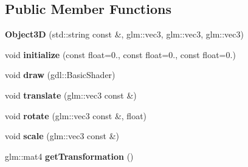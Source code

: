 \subsection*{Public Member Functions}
\begin{DoxyCompactItemize}
\item 
\hypertarget{class_object3_d_adae3ac8c78eeead08974001d61446d37}{}{\bfseries Object3\+D} (std\+::string const \&, glm\+::vec3, glm\+::vec3, glm\+::vec3)\label{class_object3_d_adae3ac8c78eeead08974001d61446d37}

\item 
\hypertarget{class_object3_d_a6c73462894a6de24d9a6281ce897d883}{}void {\bfseries initialize} (const float=0., const float=0., const float=0.)\label{class_object3_d_a6c73462894a6de24d9a6281ce897d883}

\item 
\hypertarget{class_object3_d_a5f484b792353b818c9f866482055e16a}{}void {\bfseries draw} (gdl\+::\+Basic\+Shader)\label{class_object3_d_a5f484b792353b818c9f866482055e16a}

\item 
\hypertarget{class_object3_d_a7b7eb10fd435c577bae35e3bba88802d}{}void {\bfseries translate} (glm\+::vec3 const \&)\label{class_object3_d_a7b7eb10fd435c577bae35e3bba88802d}

\item 
\hypertarget{class_object3_d_a36eb7e2f3594b2cd6990618a31e12538}{}void {\bfseries rotate} (glm\+::vec3 const \&, float)\label{class_object3_d_a36eb7e2f3594b2cd6990618a31e12538}

\item 
\hypertarget{class_object3_d_a6f1b12b86a8f2d10a51cb09c85600e09}{}void {\bfseries scale} (glm\+::vec3 const \&)\label{class_object3_d_a6f1b12b86a8f2d10a51cb09c85600e09}

\item 
\hypertarget{class_object3_d_af35bc038040e3214f85cbb95e170558b}{}glm\+::mat4 {\bfseries get\+Transformation} ()\label{class_object3_d_af35bc038040e3214f85cbb95e170558b}

\end{DoxyCompactItemize}
